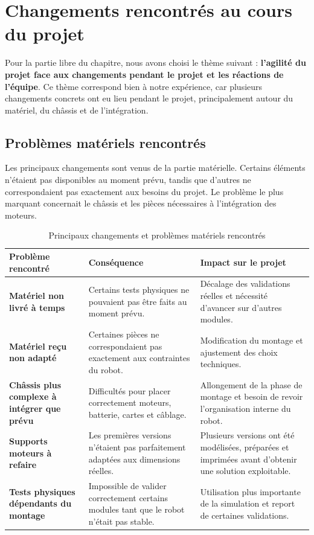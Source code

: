 \documentclass[11pt,a4paper]{report}
\begin{document}
\section{Changements rencontrés au cours du projet}

Pour la partie libre du chapitre, nous avons choisi le thème suivant : \textbf{l'agilité du projet face aux changements pendant le projet et les réactions de l'équipe}. Ce thème correspond bien à notre expérience, car plusieurs changements concrets ont eu lieu pendant le projet, principalement autour du matériel, du châssis et de l'intégration.

\subsection{Problèmes matériels rencontrés}

Les principaux changements sont venus de la partie matérielle. Certains éléments n'étaient pas disponibles au moment prévu, tandis que d'autres ne correspondaient pas exactement aux besoins du projet. Le problème le plus marquant concernait le châssis et les pièces nécessaires à l'intégration des moteurs.

\begin{table}[H]
\centering
\small
\renewcommand{\arraystretch}{1.25}
\begin{tabular}{|p{4cm}|p{5.3cm}|p{5.3cm}|}
\hline
\textbf{Problème rencontré} & \textbf{Conséquence} & \textbf{Impact sur le projet} \\
\hline
\textbf{Matériel non livré à temps} &
Certains tests physiques ne pouvaient pas être faits au moment prévu. &
Décalage des validations réelles et nécessité d'avancer sur d'autres modules. \\
\hline
\textbf{Matériel reçu non adapté} &
Certaines pièces ne correspondaient pas exactement aux contraintes du robot. &
Modification du montage et ajustement des choix techniques. \\
\hline
\textbf{Châssis plus complexe à intégrer que prévu} &
Difficultés pour placer correctement moteurs, batterie, cartes et câblage. &
Allongement de la phase de montage et besoin de revoir l'organisation interne du robot. \\
\hline
\textbf{Supports moteurs à refaire} &
Les premières versions n'étaient pas parfaitement adaptées aux dimensions réelles. &
Plusieurs versions ont été modélisées, préparées et imprimées avant d'obtenir une solution exploitable. \\
\hline
\textbf{Tests physiques dépendants du montage} &
Impossible de valider correctement certains modules tant que le robot n'était pas stable. &
Utilisation plus importante de la simulation et report de certaines validations. \\
\hline
\end{tabular}
\caption{Principaux changements et problèmes matériels rencontrés}
\label{tab:problemes_materiels}
\end{table}
\end{document}
